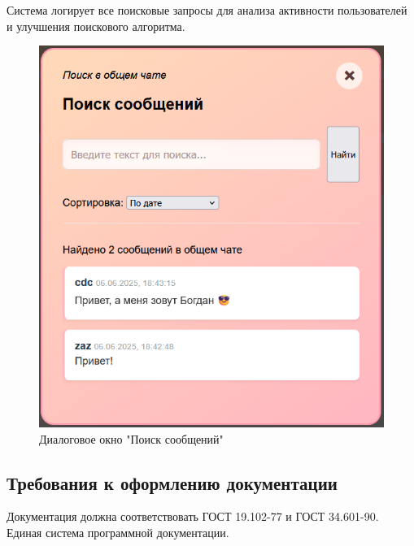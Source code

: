 Система логирует все поисковые запросы для анализа активности пользователей и улучшения поискового алгоритма.

\begin{figure}[H]
	\centering
	\includegraphics[width=0.8\linewidth]{"images/Окно поиска по сообщениям"}
	\caption{Диалоговое окно "Поиск сообщений"}
	\label{fig:search}
\end{figure}

\subsection{Требования к оформлению документации}

Документация должна соответствовать ГОСТ 19.102-77 и ГОСТ 34.601-90. Единая система программной документации.